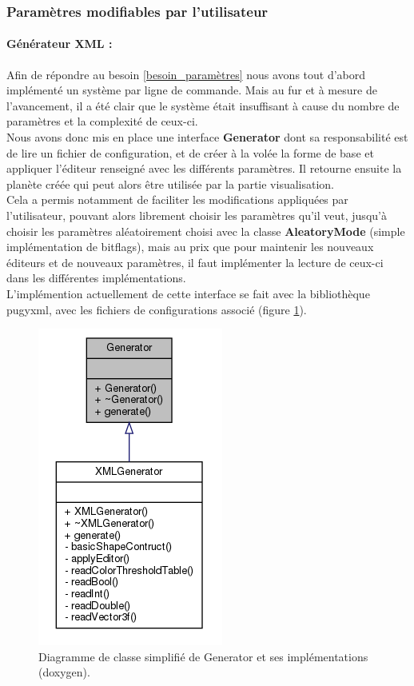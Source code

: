 \documentclass[a4paper]{article}
\begin{document}
\subsubsection{Paramètres modifiables par l'utilisateur}

\paragraph{Générateur XML :}

Afin de répondre au besoin \ref{besoin_paramètres} nous avons tout d'abord implémenté un système par ligne de commande. Mais au fur et à mesure de l'avancement, il a été clair que le système était insuffisant à cause du nombre de paramètres et la complexité de ceux-ci.\\
Nous avons donc mis en place une interface \textbf{Generator} dont sa responsabilité est de lire un fichier de configuration, et de créer à la volée la forme de base et appliquer l'éditeur renseigné avec les différents paramètres.
Il retourne ensuite la planète créée qui peut alors être utilisée par la partie visualisation.\\
Cela a permis notamment de faciliter les modifications appliquées par l'utilisateur, pouvant alors librement choisir les paramètres qu'il veut, jusqu'à choisir les paramètres aléatoirement choisi avec la classe \textbf{AleatoryMode} (simple implémentation de bitflags), mais au prix que pour maintenir les nouveaux éditeurs et de nouveaux paramètres, il faut implémenter la lecture de ceux-ci dans les différentes implémentations.\\

L'implémention actuellement de cette interface se fait avec la bibliothèque pugyxml, avec les fichiers de configurations associé (figure \ref{archi_generator}).
    \begin{figure}[!ht]
        \begin{center} \includegraphics[width=0.3\linewidth]{img/archi/archi_generator.png}\end{center}
        \caption{\label{archi_generator}Diagramme de classe simplifié de Generator et ses implémentations (doxygen).}
    \end{figure}
    
\end{document}
